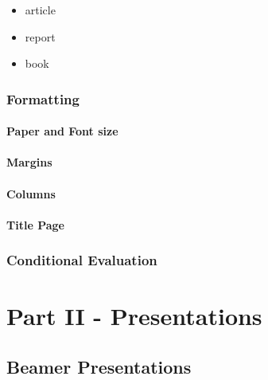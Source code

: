 \documentclass[
]{book}
\providecommand{\tightlist}{%
  \setlength{\itemsep}{0pt}\setlength{\parskip}{0pt}}
\begin{document}
\begin{itemize}
\tightlist
\item
  article
\item
  report
\item
  book
\end{itemize}

\hypertarget{formatting}{%
\section{Formatting}\label{formatting}}

\hypertarget{paper-and-font-size}{%
\subsection{Paper and Font size}\label{paper-and-font-size}}

\hypertarget{margins}{%
\subsection{Margins}\label{margins}}

\hypertarget{columns}{%
\subsection{Columns}\label{columns}}

\hypertarget{title-page}{%
\subsection{Title Page}\label{title-page}}

\hypertarget{conditional-evaluation}{%
\section{Conditional Evaluation}\label{conditional-evaluation}}

\hypertarget{part-part-ii---presentations}{%
\part{Part II - Presentations}\label{part-part-ii---presentations}}

\hypertarget{beamer-presentations}{%
\chapter{Beamer Presentations}\label{beamer-presentations}}
\end{document}
